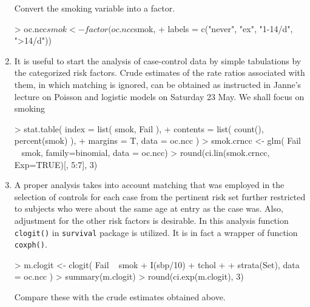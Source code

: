 \begin{enumerate}[resume]
\begin{comment}
\medskip
\begin{tabular}{r l}
\texttt{cholgrp} = &  cholesterol class,  
        1: ``<5'', 2: ``5-<6.5'', 3: ``>=6.5'', \\
\texttt{sbpgrp} = &  blood pressure class,  
       1: ``<130'', 2: ``130-<150'', 3: ``150-<170'', 4: ``>=170''.
\end{tabular}

\end{comment}

\medskip
Convert the smoking variable into a factor.
\begin{Schunk}
\begin{Sinput}
> oc.ncc$smok <- factor(oc.ncc$smok, 
+     labels = c("never", "ex", "1-14/d", ">14/d"))          
\end{Sinput}
\end{Schunk}

\item
It is useful to start the analysis of case-control data by 
simple tabulations by the categorized risk factors. 
Crude estimates of the rate ratios associated with them,
in which matching is ignored, can be obtained as instructed in Janne's lecture
on Poisson and logistic models on Saturday 23 May. We shall focus on smoking
\begin{Schunk}
\begin{Sinput}
> stat.table( index = list( smok, Fail ), 
+           contents = list( count(), percent(smok) ),
+            margins = T, data = oc.ncc )
> smok.crncc <- glm( Fail ~ smok, family=binomial, data = oc.ncc)
> round(ci.lin(smok.crncc, Exp=TRUE)[, 5:7], 3) 
\end{Sinput}
\end{Schunk}



\item
A proper analysis takes into account matching that was employed 
in the selection of controls for each case from the 
pertinent risk set further restricted to 
subjects who were about the same age at entry as the case was.
Also, adjustment for the other risk factors is desirable.
In this analysis function {\tt clogit()} in {\tt survival} package is
utilized. It is in fact a wrapper of function {\tt coxph()}. 

\begin{Schunk}
\begin{Sinput}
> m.clogit <- clogit( Fail ~ smok + I(sbp/10) + tchol + 
+        strata(Set), data = oc.ncc )
> summary(m.clogit)
> round(ci.exp(m.clogit), 3)
\end{Sinput}
\end{Schunk}

Compare these with the crude estimates obtained above.

\end{enumerate} %



